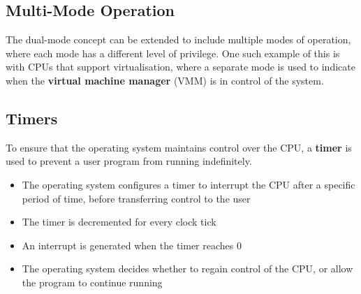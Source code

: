 \documentclass{article}
\begin{document}
\subsection{Multi-Mode Operation}
The dual-mode concept can be extended to include multiple modes of operation, where each mode has a different level of privilege.
One such example of this is with CPUs that support virtualisation, where a separate mode is used to indicate when the \textbf{virtual machine manager} (VMM)
is in control of the system.
\subsection{Timers}
To ensure that the operating system maintains control over the CPU, a \textbf{timer} is used to prevent a user program from running indefinitely.
\begin{itemize}
    \item The operating system configures a timer to interrupt the CPU after a specific period of time, before transferring control to the user
    \item The timer is decremented for every clock tick
    \item An interrupt is generated when the timer reaches 0
    \item The operating system decides whether to regain control of the CPU, or allow the program to continue running
\end{itemize}
\end{document}
